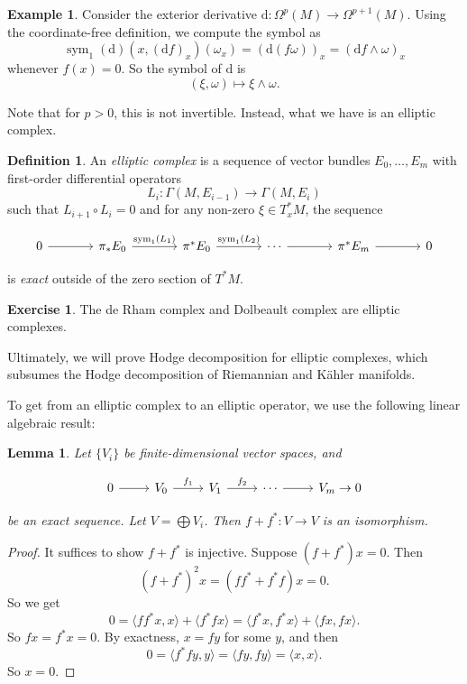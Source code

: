 \documentclass{shortart}
\newtheorem*{lemma}{Lemma}
\theoremstyle{definition}
\newtheorem*{defi}{Definition}
\newtheorem*{eg}{Example}
\newtheorem*{ex}{Exercise}
\newcommand\bra\langle
\newcommand\ket\rangle
\renewcommand\d{\mathrm{d}}
\DeclareMathOperator\symb{sym}
\begin{document}
\begin{eg}
  Consider the exterior derivative $\d: \Omega^p(M) \to \Omega^{p + 1}(M)$. Using the coordinate-free definition, we compute the symbol as
  \[
    \symb_1(\d)(x, (\d f)_x)(\omega_x) = (\d (f\omega))_x = (\d f \wedge \omega)_x
  \]
  whenever $f(x) = 0$. So the symbol of $\d$ is
  \[
    (\xi, \omega) \mapsto \xi \wedge \omega.
  \]
\end{eg}
Note that for $p > 0$, this is not invertible. Instead, what we have is an elliptic complex.
\begin{defi}
  An \emph{elliptic complex} is a sequence of vector bundles $E_0, \ldots, E_m$ with first-order differential operators
  \[
    L_i: \Gamma(M, E_{i - 1}) \to \Gamma(M, E_i)
  \]
  such that $L_{i + 1} \circ L_i = 0$ and for any non-zero $\xi \in T^*_x M$, the sequence
  \begin{useimager}
    \[
      \begin{tikzcd}[column sep=large]
        0 \ar[r] & \pi_* E_0 \ar[r, "\symb_1(L_1)"] & \pi^* E_0 \ar[r, "\symb_1(L_2)"] & \cdots \ar[r] & \pi^* E_m \ar[r] & 0
      \end{tikzcd}
    \]
  \end{useimager}
  is \emph{exact} outside of the zero section of $T^*M$.
\end{defi}
\begin{ex}
  The de Rham complex and Dolbeault complex are elliptic complexes.
\end{ex}
Ultimately, we will prove Hodge decomposition for elliptic complexes, which subsumes the Hodge decomposition of Riemannian and K\"ahler manifolds.

To get from an elliptic complex to an elliptic operator, we use the following linear algebraic result:
\begin{lemma}
  Let $\{V_i\}$ be finite-dimensional vector spaces, and 
  \begin{useimager}
    \[
      \begin{tikzcd}
        0 \ar[r] & V_0 \ar[r, "f_1"] & V_1 \ar[r, "f_2"] & \cdots \ar[r] & V_m \to 0
      \end{tikzcd}
    \]
  \end{useimager}
  be an exact sequence. Let $V = \bigoplus V_i$. Then $f + f^*: V \to V$ is an isomorphism.
\end{lemma}

\begin{proof}
  It suffices to show $f + f^*$ is injective. Suppose $(f + f^*)x = 0$. Then
  \[
    (f + f^*)^2 x = (ff^* + f^* f)x = 0.
  \]
  So we get
  \[
    0 = \bra ff^*x, x\ket + \bra f^*fx\ket = \bra f^* x, f^* x\ket + \bra fx, fx\ket.
  \]
  So $fx = f^*x = 0$. By exactness, $x = fy$ for some $y$, and then
  \[
    0 = \bra f^* fy, y\ket = \bra fy, fy\ket = \bra x, x \ket.
  \]
  So $x = 0$.
\end{proof}
\end{document}
